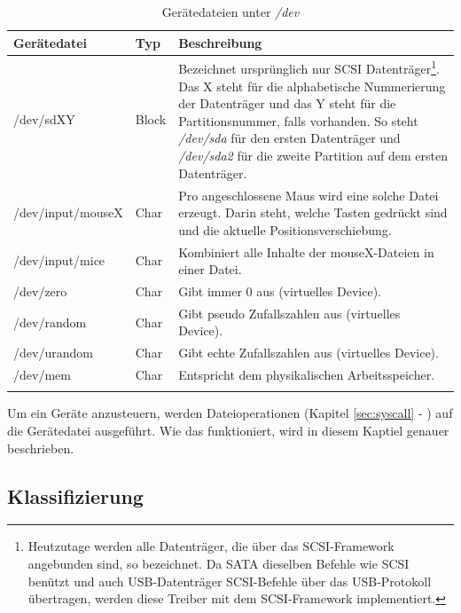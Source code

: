 \begin{longtable}{| l | l | p{10cm} |} \hline
   \textbf{Gerätedatei} & \textbf{Typ} & \textbf{Beschreibung} \\ \hline
   /dev/sdXY         & Block & Bezeichnet ursprünglich nur SCSI Datenträger\footnote{Heutzutage werden alle Datenträger, die
                               über das SCSI-Framework angebunden sind, so bezeichnet. Da SATA dieselben Befehle wie SCSI benützt
                               und auch USB-Datenträger SCSI-Befehle über das USB-Protokoll übertragen, werden diese Treiber mit
                               dem SCSI-Framework implementiert.}. Das X steht für die alphabetische Nummerierung
                               der Datenträger und das Y steht für die Partitionsnummer, falls vorhanden. So steht \emph{/dev/sda} 
                               für den ersten Datenträger und \emph{/dev/sda2} für die zweite Partition auf dem ersten Datenträger. \\ \hline
   /dev/input/mouseX & Char & Pro angeschlossene Maus wird eine solche Datei erzeugt. Darin steht, welche Tasten gedrückt sind und die aktuelle Positionsverschiebung. \\ \hline
   /dev/input/mice   & Char & Kombiniert alle Inhalte der mouseX-Dateien in einer Datei. \\ \hline
   /dev/zero         & Char & Gibt immer 0 aus (virtuelles Device).\\ \hline
   /dev/random       & Char & Gibt pseudo Zufallszahlen aus (virtuelles Device).\\ \hline
   /dev/urandom      & Char & Gibt echte Zufallszahlen aus (virtuelles Device).\\ \hline
   /dev/mem          & Char & Entspricht dem physikalischen Arbeitsspeicher. \\ \hline
   \caption{Gerätedateien unter \emph{/dev}}
   \label{tab:dev_tab}
\end{longtable}

Um ein Geräte anzusteuern, werden Dateioperationen (Kapitel \ref{sec:syscall} - \emph{}) auf die Gerätedatei ausgeführt. Wie das funktioniert, wird in diesem Kaptiel genauer
beschrieben.

\subsection{Klassifizierung}

